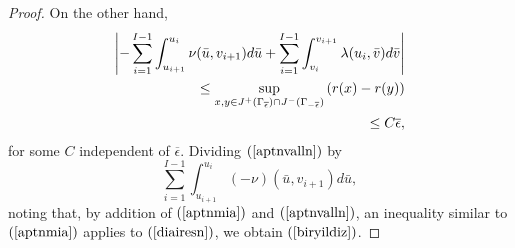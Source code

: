 \documentclass{article}
\begin{document}
{\begin{proof}
On the other hand,
\begin{eqnarray}
\label{aptnvalln}
\nonumber
\left|-\sum_{i=1}^{I-1}\int_{u_{i+1}}^{u_i}\nu(\bar{u},v_{i+1}) d\bar{u}
+\sum_{i=1}^{I-1}\int_{v_i}^{v_{i+1}}\lambda(u_i,\bar{v}) d\bar{v}\right|\\
\nonumber
\hbox{\ }\le\sup_{x,y\in J^+(\Gamma_{\overline\epsilon})\cap
J^-(\Gamma_{-\overline\epsilon})}{(r(x)-r(y))}\\
\hbox{\ }\le C\overline{\epsilon},
\end{eqnarray}
for some $C$ independent of $\overline\epsilon$.
Dividing $(\ref{aptnvalln})$ by 
\begin{equation}
\label{diairesn}
\sum_{i=1}^{I-1}\int_{u_{i+1}}^{u_i}(-\nu)(\bar{u},v_{i+1}) d\bar{u},
\end{equation}
noting
that, by addition of $(\ref{aptnmia})$ and $(\ref{aptnvalln})$,
an inequality similar to $(\ref{aptnmia})$ applies to
$(\ref{diairesn})$,
we obtain $(\ref{biryildiz})$.


\end{proof}}
\end{document}
